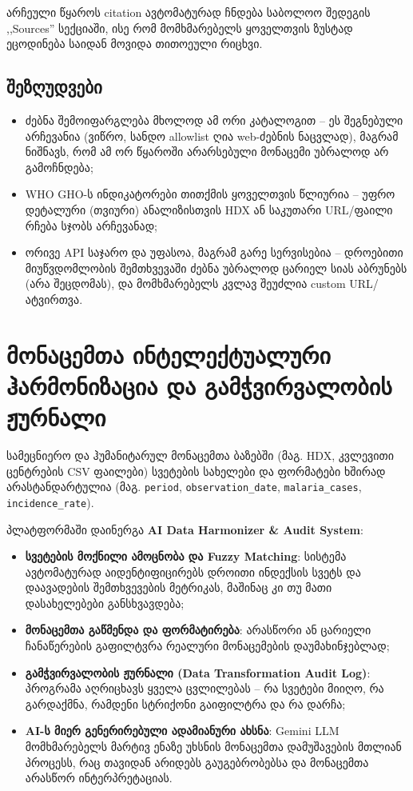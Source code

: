 \documentclass[11pt,a4paper]{article}
\begin{document}
არჩეული წყაროს citation ავტომატურად ჩნდება საბოლოო შედეგის ,,Sources''
სექციაში, ისე რომ მომხმარებელს ყოველთვის ზუსტად ეცოდინება საიდან
მოვიდა თითოეული რიცხვი.

\subsection{შეზღუდვები}
\begin{itemize}[leftmargin=1.4em]
  \item ძებნა შემოიფარგლება მხოლოდ ამ ორი კატალოგით -- ეს შეგნებული
    არჩევანია (ვიწრო, სანდო allowlist ღია web-ძებნის ნაცვლად), მაგრამ
    ნიშნავს, რომ ამ ორ წყაროში არარსებული მონაცემი უბრალოდ არ გამოჩნდება;
  \item WHO GHO-ს ინდიკატორები თითქმის ყოველთვის წლიურია -- უფრო
    დეტალური (თვიური) ანალიზისთვის HDX ან საკუთარი URL/ფაილი რჩება
    სჯობს არჩევანად;
  \item ორივე API საჯარო და უფასოა, მაგრამ გარე სერვისებია -- დროებითი
    მიუწვდომლობის შემთხვევაში ძებნა უბრალოდ ცარიელ სიას აბრუნებს
    (არა შეცდომას), და მომხმარებელს კვლავ შეუძლია custom URL/ატვირთვა.
\end{itemize}

\section{მონაცემთა ინტელექტუალური ჰარმონიზაცია და გამჭვირვალობის ჟურნალი}
\label{sec:data-harmonization}

სამეცნიერო და ჰუმანიტარულ მონაცემთა ბაზებში (მაგ. HDX, კვლევითი ცენტრების
CSV ფაილები) სვეტების სახელები და ფორმატები ხშირად არასტანდარტულია
(მაგ. \texttt{period}, \texttt{observation\_date}, \texttt{malaria\_cases},
\texttt{incidence\_rate}). 

პლატფორმაში დაინერგა \textbf{AI Data Harmonizer \& Audit System}:
\begin{itemize}[leftmargin=1.4em]
  \item \textbf{სვეტების მოქნილი ამოცნობა და Fuzzy Matching}: სისტემა
    ავტომატურად აიდენტიფიცირებს დროითი ინდექსის სვეტს და დაავადების
    შემთხვევების მეტრიკას, მაშინაც კი თუ მათი დასახელებები განსხვავდება;
  \item \textbf{მონაცემთა გაწმენდა და ფორმატირება}: არასწორი ან ცარიელი
    ჩანაწერების გაფილტვრა რეალური მონაცემების დაუმახინჯებლად;
  \item \textbf{გამჭვირვალობის ჟურნალი (Data Transformation Audit Log)}:
    პროგრამა აღრიცხავს ყველა ცვლილებას -- რა სვეტები მიიღო, რა გარდაქმნა,
    რამდენი სტრიქონი გაიფილტრა და რა დარჩა;
  \item \textbf{AI-ს მიერ გენერირებული ადამიანური ახსნა}: Gemini LLM
    მომხმარებელს მარტივ ენაზე უხსნის მონაცემთა დამუშავების მთლიან პროცესს,
    რაც თავიდან არიდებს გაუგებრობებსა და მონაცემთა არასწორ ინტერპრეტაციას.
\end{itemize}
\end{document}
